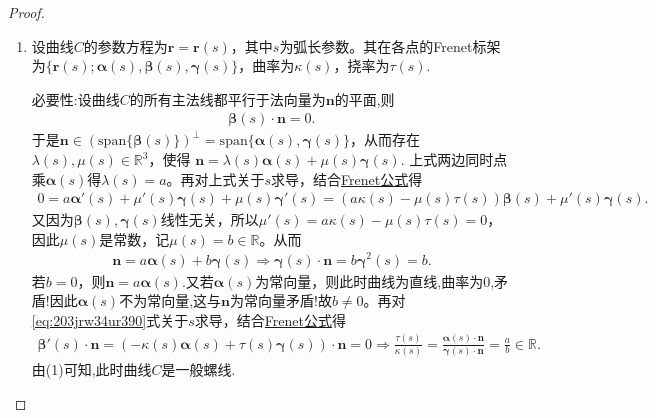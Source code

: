 \documentclass[../../main.tex]{subfiles}%
\begin{document}
\begin{proof}
\begin{enumerate}[(1)]
{\heiti 充分性:}设$\frac{\tau(s)}{\kappa(s)}=C\in\mathbb{R}$，则$\tau(s)=C\kappa(s)$。令$f(s)=\bm{\beta}(s)\times(\bm{\alpha}(s)-C\bm{\gamma}(s))$，则由\hyperref[theorem:微分几何-Frenet公式]{Frenet公式}可得
\begin{align*}
f'(s)&=\bm{\beta}'(s)\times(\bm{\alpha}(s)-C\bm{\gamma}(s))+\bm{\beta}(s)\times(\bm{\alpha}'(s)-C\bm{\gamma}'(s))\\
&=(-\kappa(s)\bm{\alpha}(s)+\tau(s)\bm{\gamma}(s))\times(\bm{\alpha}(s)-C\bm{\gamma}(s))+\bm{\beta}(s)\times(\kappa(s)\bm{\beta}(s)+C\tau(s)\bm{\beta}(s))\\
&=(C\kappa(s)-\tau(s))(\bm{\alpha}(s)\times\bm{\gamma}(s))=0.
\end{align*}
故$f(s)$是常向量，记$\bm{n}=f(s)=\bm{\beta}(s)\times(\bm{\alpha}(s)-C\bm{\gamma}(s))$，则
\begin{align*}
\bm{\alpha}(s)\cdot\bm{n}=\bm{\alpha}(s)\cdot\left[\bm{\beta}(s)\times(\bm{\alpha}(s)-C\bm{\gamma}(s))\right]
=\bm{\alpha}(s)\cdot(\bm{\beta}(s)\times\bm{\alpha}(s))-\bm{\alpha}(s)\cdot(\bm{\beta}(s)\times C\bm{\gamma}(s))=C\bm{\alpha}^2(s)=C,
\end{align*}
即曲线$C$各点切向量与常向量$\bm{n}$成定角。

\item 设曲线$C$的参数方程为$\bm{r}=\bm{r}(s)$，其中$s$为弧长参数。其在各点的Frenet标架为$\{\bm{r}(s);\bm{\alpha}(s),\bm{\beta}(s),\bm{\gamma}(s)\}$，曲率为$\kappa(s)$，挠率为$\tau(s)$.

{\heiti 必要性:}设曲线$C$的所有主法线都平行于法向量为$\bm{n}$的平面,则
\begin{align}\label{eq:203jrw34ur390}
\bm{\beta}(s)\cdot \bm{n}=0.
\end{align}
于是$\bm{n}\in(\mathrm{span}\{\bm{\beta}(s)\})^\perp=\mathrm{span}\{\bm{\alpha}(s),\bm{\gamma}(s)\}$，从而存在$\lambda(s),\mu(s)\in\mathbb{R}^3$，使得
$\bm{n}=\lambda(s)\bm{\alpha}(s)+\mu(s)\bm{\gamma}(s).$
上式两边同时点乘$\bm{\alpha}(s)$得$\lambda(s)=a$。再对上式关于$s$求导，结合\hyperref[theorem:微分几何-Frenet公式]{Frenet公式}得
\begin{align*}
0=a\bm{\alpha}'(s)+\mu'(s)\bm{\gamma}(s)+\mu(s)\bm{\gamma}'(s)=(a\kappa(s)-\mu(s)\tau(s))\bm{\beta}(s)+\mu'(s)\bm{\gamma}(s).
\end{align*}
又因为$\bm{\beta}(s),\bm{\gamma}(s)$线性无关，所以$\mu'(s)=a\kappa(s)-\mu(s)\tau(s)=0$，因此$\mu(s)$是常数，记$\mu(s)=b\in\mathbb{R}$。从而
\begin{align*}
\bm{n}=a\bm{\alpha}(s)+b\bm{\gamma}(s)\Longrightarrow\bm{\gamma}(s)\cdot\bm{n}=b\bm{\gamma}^2(s)=b.
\end{align*}
若$b=0$，则$\bm{n}=a\bm{\alpha}(s)$.又若$\bm{\alpha}(s)$为常向量，则此时曲线为直线,曲率为0,矛盾!因此$\bm{\alpha}(s)$不为常向量,这与$\bm{n}$为常向量矛盾!故$b\ne0$。再对\eqref{eq:203jrw34ur390}式关于$s$求导，结合\hyperref[theorem:微分几何-Frenet公式]{Frenet公式}得
\begin{align*}
\bm{\beta}'(s)\cdot\bm{n}=(-\kappa(s)\bm{\alpha}(s)+\tau(s)\bm{\gamma}(s))\cdot\bm{n}=0\Longrightarrow\frac{\tau(s)}{\kappa(s)}=\frac{\bm{\alpha}(s)\cdot\bm{n}}{\bm{\gamma}(s)\cdot\bm{n}}=\frac{a}{b}\in\mathbb{R}.
\end{align*}
由(1)可知,此时曲线$C$是一般螺线.


\end{enumerate}
\end{proof}
\end{document}
